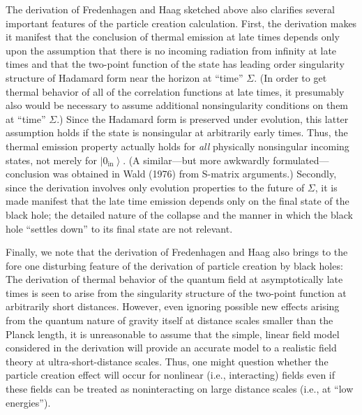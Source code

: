 \documentclass[11pt,a4paper]{article}
\providecommand{\ket}[1]{\left\lvert#1\right\rangle}
\begin{document}
The derivation of Fredenhagen and Haag sketched above also clarifies several important features of the particle creation calculation. First, the derivation makes it manifest that the conclusion of thermal emission at late times depends only upon the assumption that there is no incoming radiation from infinity at late times and that the two-point function of the state has leading order singularity structure of Hadamard form near the horizon at ``time'' \(\Sigma\). (In order to get thermal behavior of all of the correlation functions at \hypertarget{source-175}{} late times, it presumably also would be necessary to assume additional nonsingularity conditions on them at ``time'' \(\Sigma\).) Since the Hadamard form is preserved under evolution, this latter assumption holds if the state is nonsingular at arbitrarily early times. Thus, the thermal emission property actually holds for \emph{all} physically nonsingular incoming states, not merely for \(\ket{0_{\mathrm{in}}}\). (A similar---but more awkwardly formulated---conclusion was obtained in Wald (1976) from S-matrix arguments.) Secondly, since the derivation involves only evolution properties to the future of \(\Sigma\), it is made manifest that the late time emission depends only on the final state of the black hole; the detailed nature of the collapse and the manner in which the black hole ``settles down'' to its final state are not relevant.

Finally, we note that the derivation of Fredenhagen and Haag also brings to the fore one disturbing feature of the derivation of particle creation by black holes: The derivation of thermal behavior of the quantum field at asymptotically late times is seen to arise from the singularity structure of the two-point function at arbitrarily short distances. However, even ignoring possible new effects arising from the quantum nature of gravity itself at distance scales smaller than the Planck length, it is unreasonable to assume that the simple, linear field model considered in the derivation will provide an accurate model to a realistic field theory at ultra-short-distance scales. Thus, one might question whether the particle creation effect will occur for nonlinear (i.e., interacting) fields even if these fields can be treated as noninteracting on large distance scales (i.e., at ``low energies'').
\end{document}
